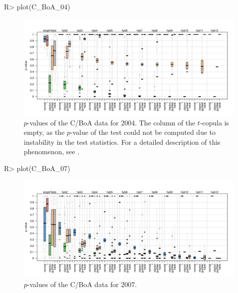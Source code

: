 \begin{example}
R> plot(C_BoA_04)
\end{example}
\vspace{-1cm}
\begin{figure}[H]
	\centering
 \includegraphics[width=\textwidth]{img/C_BoA_04.pdf}
	\caption{$p$-values of the C/BoA data for 2004. The column \mycolor \protect{} \bk of the $t$-copula is empty, as the $p$-value of the test \protect{} could not be computed due to instability in the test statistics. For a detailed description of this phenomenon, see \citet{schepsmeier2018package}.}
	\label{Pirateplot_C_BoA_04}
\end{figure}

\vspace{0.25cm}
\begin{example}
R> plot(C_BoA_07)
\end{example}
\vspace{-1cm}
\begin{figure}[H]
	\centering
 \includegraphics[width=\textwidth]{img/C_BoA_07.pdf}
	\caption{$p$-values of the C/BoA data for 2007.}
	\label{Pirateplot_C_BoA_07}
\end{figure}

